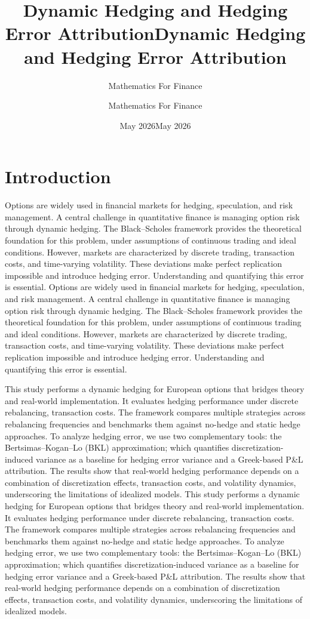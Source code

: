 \documentclass{article}
\title{Dynamic Hedging and Hedging Error Attribution}
\author{Mathematics For Finance}
\date{May 2026}
\title{Dynamic Hedging and Hedging Error Attribution}
\author{Mathematics For Finance}
\date{May 2026}
\begin{document}
\maketitle

\section{Introduction}

Options are widely used in financial markets for hedging, speculation, and risk management. A central challenge in quantitative finance is managing option risk through dynamic hedging. The Black–Scholes framework provides the theoretical foundation for this problem, under assumptions of continuous trading and ideal conditions. However, markets are characterized by discrete trading, transaction costs, and time-varying volatility. These deviations make perfect replication impossible and introduce hedging error. Understanding and quantifying this error is essential.
Options are widely used in financial markets for hedging, speculation, and risk management. A central challenge in quantitative finance is managing option risk through dynamic hedging. The Black–Scholes framework provides the theoretical foundation for this problem, under assumptions of continuous trading and ideal conditions. However, markets are characterized by discrete trading, transaction costs, and time-varying volatility. These deviations make perfect replication impossible and introduce hedging error. Understanding and quantifying this error is essential.

This study performs a dynamic hedging for European options that bridges theory and real-world implementation. It evaluates hedging performance under discrete rebalancing, transaction costs. The framework compares multiple strategies across rebalancing frequencies and benchmarks them against no-hedge and static hedge approaches. To analyze hedging error, we use two complementary tools: the Bertsimas–Kogan–Lo (BKL) approximation; which quantifies discretization-induced variance as a baseline for hedging error variance and a Greek-based P\&L attribution. The results show that real-world hedging performance depends on a combination of discretization effects, transaction costs, and volatility dynamics, underscoring the limitations of idealized models.
This study performs a dynamic hedging for European options that bridges theory and real-world implementation. It evaluates hedging performance under discrete rebalancing, transaction costs. The framework compares multiple strategies across rebalancing frequencies and benchmarks them against no-hedge and static hedge approaches. To analyze hedging error, we use two complementary tools: the Bertsimas–Kogan–Lo (BKL) approximation; which quantifies discretization-induced variance as a baseline for hedging error variance and a Greek-based P\&L attribution. The results show that real-world hedging performance depends on a combination of discretization effects, transaction costs, and volatility dynamics, underscoring the limitations of idealized models.
\end{document}
